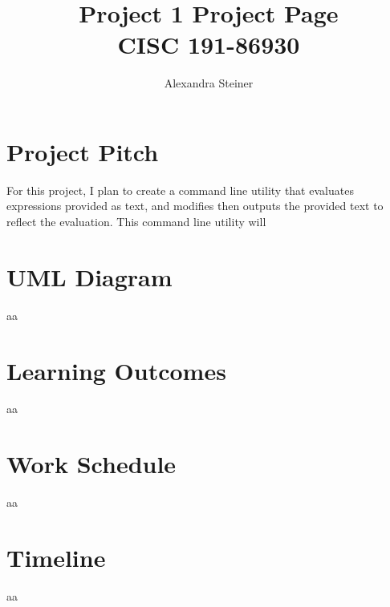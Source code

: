 \documentclass{article}
\title{%
	Project 1 Project Page\\
    \large CISC 191-86930}
\author{Alexandra Steiner}
\begin{document}
\maketitle

\tableofcontents

\section{Project Pitch}
For this project, I plan to create a command line utility that evaluates expressions provided as text, and modifies then outputs the provided text to reflect the evaluation. This command line utility will 
\section{UML Diagram}
aa
\section{Learning Outcomes}
aa
\section{Work Schedule}
aa
\section{Timeline}
aa
\end{document}
